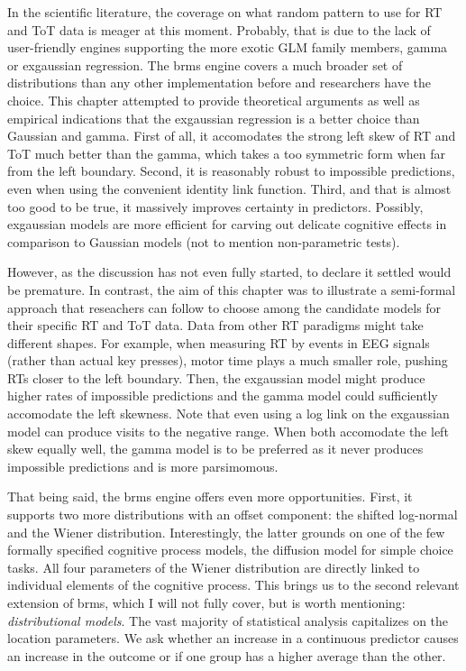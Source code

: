 \documentclass[]{svmono}
\theoremstyle{definition}
\theoremstyle{definition}
\theoremstyle{definition}
\theoremstyle{remark}
\begin{document}
In the scientific literature, the coverage on what random pattern to use
for RT and ToT data is meager at this moment. Probably, that is due to
the lack of user-friendly engines supporting the more exotic GLM family
members, gamma or exgaussian regression. The brms engine covers a much
broader set of distributions than any other implementation before and
researchers have the choice. This chapter attempted to provide
theoretical arguments as well as empirical indications that the
exgaussian regression is a better choice than Gaussian and gamma. First
of all, it accomodates the strong left skew of RT and ToT much better
than the gamma, which takes a too symmetric form when far from the left
boundary. Second, it is reasonably robust to impossible predictions,
even when using the convenient identity link function. Third, and that
is almost too good to be true, it massively improves certainty in
predictors. Possibly, exgaussian models are more efficient for carving
out delicate cognitive effects in comparison to Gaussian models (not to
mention non-parametric tests).

However, as the discussion has not even fully started, to declare it
settled would be premature. In contrast, the aim of this chapter was to
illustrate a semi-formal approach that reseachers can follow to choose
among the candidate models for their specific RT and ToT data. Data from
other RT paradigms might take different shapes. For example, when
measuring RT by events in EEG signals (rather than actual key presses),
motor time plays a much smaller role, pushing RTs closer to the left
boundary. Then, the exgaussian model might produce higher rates of
impossible predictions and the gamma model could sufficiently accomodate
the left skewness. Note that even using a log link on the exgaussian
model can produce visits to the negative range. When both accomodate the
left skew equally well, the gamma model is to be preferred as it never
produces impossible predictions and is more parsimomous.

That being said, the brms engine offers even more opportunities. First,
it supports two more distributions with an offset component: the shifted
log-normal and the Wiener distribution. Interestingly, the latter
grounds on one of the few formally specified cognitive process models,
the diffusion model for simple choice tasks. All four parameters of the
Wiener distribution are directly linked to individual elements of the
cognitive process. This brings us to the second relevant extension of
brms, which I will not fully cover, but is worth mentioning:
\emph{distributional models}. The vast majority of statistical analysis
capitalizes on the location parameters. We ask whether an increase in a
continuous predictor causes an increase in the outcome or if one group
has a higher average than the other.
\end{document}
